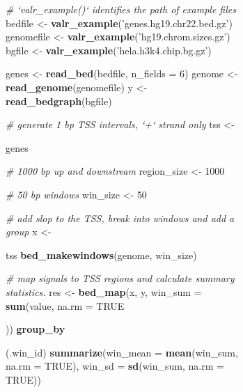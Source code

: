 \documentclass[9pt,a4paper]{extarticle}
\renewcommand{\KeywordTok}[1]{\textbf{{#1}}}
\renewcommand{\DataTypeTok}[1]{\textcolor[rgb]{0.50,0.00,0.00}{{#1}}}
\renewcommand{\DecValTok}[1]{\textcolor[rgb]{0.00,0.00,1.00}{{#1}}}
\renewcommand{\StringTok}[1]{\textcolor[rgb]{0.87,0.00,0.00}{{#1}}}
\renewcommand{\CommentTok}[1]{\textcolor[rgb]{0.50,0.50,0.50}{\textit{{#1}}}}
\renewcommand{\OtherTok}[1]{{#1}}
\renewcommand{\NormalTok}[1]{{#1}}
\begin{document}
\begin{figure}
\centering
    \begin{subfigure}[b]{\textwidth}
\begin{Shaded}
\begin{Highlighting}[]
\CommentTok{# `valr_example()` identifies the path of example files}
\NormalTok{bedfile <-}\StringTok{ }\KeywordTok{valr_example}\NormalTok{(}\StringTok{'genes.hg19.chr22.bed.gz'}\NormalTok{)}
\NormalTok{genomefile <-}\StringTok{ }\KeywordTok{valr_example}\NormalTok{(}\StringTok{'hg19.chrom.sizes.gz'}\NormalTok{)}
\NormalTok{bgfile  <-}\StringTok{ }\KeywordTok{valr_example}\NormalTok{(}\StringTok{'hela.h3k4.chip.bg.gz'}\NormalTok{)}

\NormalTok{genes <-}\StringTok{ }\KeywordTok{read_bed}\NormalTok{(bedfile, }\DataTypeTok{n_fields =} \DecValTok{6}\NormalTok{)}
\NormalTok{genome <-}\StringTok{ }\KeywordTok{read_genome}\NormalTok{(genomefile)}
\NormalTok{y <-}\StringTok{ }\KeywordTok{read_bedgraph}\NormalTok{(bgfile)}

\CommentTok{# generate 1 bp TSS intervals, `+` strand only}
\NormalTok{tss <-}\StringTok{ }\NormalTok{genes %

\CommentTok{# 1000 bp up and downstream}
\NormalTok{region_size <-}\StringTok{ }\DecValTok{1000}

\CommentTok{# 50 bp windows}
\NormalTok{win_size <-}\StringTok{ }\DecValTok{50}

\CommentTok{# add slop to the TSS, break into windows and add a group}
\NormalTok{x <-}\StringTok{ }\NormalTok{tss %
\StringTok{  }\KeywordTok{bed_makewindows}\NormalTok{(genome, win_size)}

\CommentTok{# map signals to TSS regions and calculate summary statistics.}
\NormalTok{res <-}\StringTok{ }\KeywordTok{bed_map}\NormalTok{(x, y, }\DataTypeTok{win_sum =} \KeywordTok{sum}\NormalTok{(value, }\DataTypeTok{na.rm =} \OtherTok{TRUE}\NormalTok{)) %
\StringTok{  }\KeywordTok{group_by}\NormalTok{(.win_id) %
\StringTok{  }\KeywordTok{summarize}\NormalTok{(}\DataTypeTok{win_mean =} \KeywordTok{mean}\NormalTok{(win_sum, }\DataTypeTok{na.rm =} \OtherTok{TRUE}\NormalTok{),}
            \DataTypeTok{win_sd =} \KeywordTok{sd}\NormalTok{(win_sum, }\DataTypeTok{na.rm =} \OtherTok{TRUE}\NormalTok{))}

}}}}
\end{Highlighting}
\end{Shaded}
\end{subfigure}
\end{figure}
\end{document}

